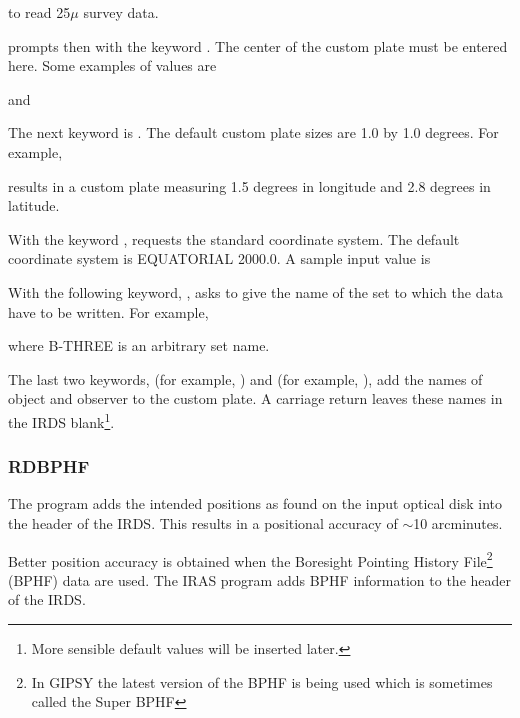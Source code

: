
to read 25$\mu$ survey data.

 prompts then with the keyword .  The
center of the custom plate must be entered here.  Some examples of
values are


and


The next keyword is .  The default custom plate sizes are 1.0
by 1.0 degrees.  For example,


results in a custom plate measuring 1.5 degrees in longitude and 2.8 degrees
in latitude.

With the keyword ,  requests the standard
coordinate system.  The default coordinate system is EQUATORIAL 2000.0. 
A sample input value is


With the following keyword, ,  asks to give
the name of the set to which the data have to be written.  For example,

 
where B-THREE is an arbitrary set name.

The last two keywords,  (for example,
) and  (for example,
), add the names of object and observer to
the custom plate.  A carriage return leaves these names in the IRDS
blank\footnote{More sensible default values will be inserted later.}. 

\subsubsection{RDBPHF}

The program  adds the intended positions as found on
the input optical disk into the header of the IRDS.  This results in a
positional accuracy of $\sim$10 arcminutes. 

Better position accuracy is obtained when the Boresight Pointing History
File\footnote{In GIPSY the latest version of the BPHF is being used
which is sometimes called the Super BPHF} (BPHF) data are used.  The
IRAS program  adds BPHF information to the header of the
IRDS. 

